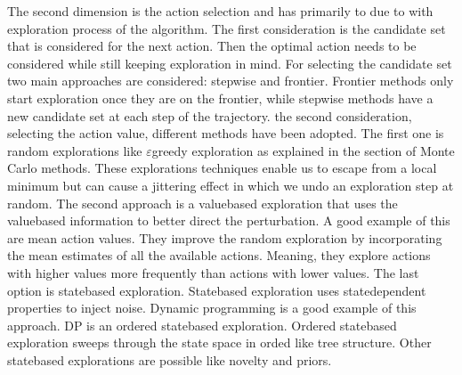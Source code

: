 \documentclass[letterpaper,10pt,english]{jupyterBook}
\begin{document}
\sphinxAtStartPar
The second dimension is the action selection and has primarily to due to with exploration process of the algorithm. The first consideration is the candidate set that is considered for the next action. Then the optimal action needs to be considered while still keeping exploration in mind. For selecting the candidate set two main approaches are considered: step\sphinxhyphen{}wise and frontier. Frontier methods only start exploration once they are on the frontier, while step\sphinxhyphen{}wise methods have a new candidate set at each step of the trajectory. the second consideration, selecting the action value,  different methods have been adopted. The first one is random explorations like \(\varepsilon\)\sphinxhyphen{}greedy exploration as explained in the section of Monte Carlo methods. These explorations techniques enable us to escape from a local minimum but can cause a jittering effect in which we undo an exploration step at random. The second approach is a value\sphinxhyphen{}based exploration that uses the value\sphinxhyphen{}based information to better direct the perturbation. A good example of this are mean action values. They improve the random exploration by incorporating the mean estimates of all the available actions. Meaning, they explore actions with higher values more frequently than actions with lower values. The last option is state\sphinxhyphen{}based exploration. State\sphinxhyphen{}based exploration uses state\sphinxhyphen{}dependent properties to inject noise. Dynamic programming is a good example of this approach. DP is an ordered state\sphinxhyphen{}based exploration. Ordered state\sphinxhyphen{}based exploration sweeps through the state space in orded like tree structure. Other state\sphinxhyphen{}based explorations are possible like novelty and priors.
\end{document}
